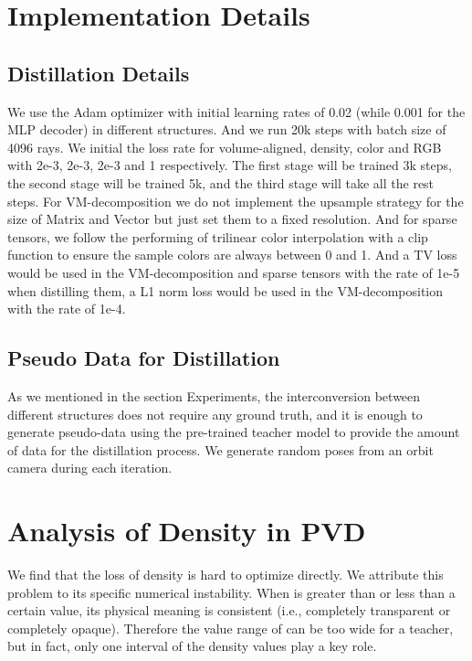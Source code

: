 \documentclass[letterpaper]{article} \usepackage{aaai23}  \usepackage{times}  \usepackage{helvet}  \usepackage{courier}  \usepackage[hyphens]{url}  \usepackage{graphicx} \urlstyle{rm} \def\UrlFont{\rm}  \usepackage{natbib}  \usepackage{caption} \frenchspacing  \setlength{\pdfpagewidth}{8.5in}  \setlength{\pdfpageheight}{11in}  \usepackage{multirow}
\begin{document}
\section{Implementation Details}
\subsection{Distillation Details}We use the Adam optimizer with initial learning rates of 0.02 (while 0.001 for the MLP decoder) in different structures. And we run 20k steps with batch size of 4096 rays. We initial the loss rate for volume-aligned, density, color and RGB with 2e-3, 2e-3, 2e-3 and 1 respectively. The first stage will be trained 3k steps, the second stage will be trained 5k, and the third stage will take all the rest steps. For VM-decomposition we do not implement the upsample strategy for the size of Matrix and Vector but just set them to a fixed resolution. And for sparse tensors, we follow the performing of trilinear color interpolation with a clip function to ensure the sample colors are always between 0 and 1. And a TV loss would be used in the VM-decomposition and sparse tensors with the rate of 1e-5 when distilling them, a L1 norm loss would be used in the VM-decomposition with the rate of 1e-4.

\subsection{Pseudo Data for Distillation}
As we mentioned in the section Experiments, the interconversion between different structures does not require any ground truth, and it is enough to generate pseudo-data using the pre-trained teacher model to provide the amount of data for the distillation process. We generate random poses from an orbit camera during each iteration.

\section{Analysis of Density in PVD}
We find that the loss of density  is hard to optimize directly. We attribute this problem to its specific numerical instability. When  is greater than or less than a certain value, its physical meaning is consistent (i.e., completely transparent or completely opaque). Therefore the value range of  can be too wide for a teacher, but in fact, only one interval of the density values play a key role. 
\end{document}
